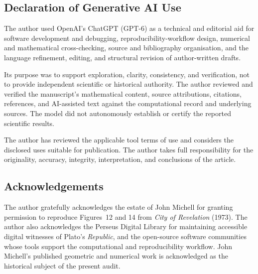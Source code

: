 \documentclass[11pt]{article}
\begin{document}
\subsection*{Declaration of Generative AI Use}

The author used OpenAI's ChatGPT (GPT-6) as a technical and editorial aid
for software development and debugging, reproducibility-workflow design,
numerical and mathematical cross-checking, source and bibliography
organisation, and the language refinement, editing, and structural revision
of author-written drafts.

Its purpose was to support exploration, clarity, consistency, and verification,
not to provide independent scientific or historical authority.  The author
reviewed and verified the manuscript's mathematical content, source
attributions, citations, references, and AI-assisted text against the
computational record and underlying sources.  The model did not autonomously
establish or certify the reported scientific results.

The author has reviewed the applicable tool terms of use and considers the
disclosed uses suitable for publication.  The author takes full responsibility
for the originality, accuracy, integrity, interpretation, and conclusions
of the article.

\subsection*{Acknowledgements}

The author gratefully acknowledges the estate of John Michell for granting
permission to reproduce Figures~12 and 14 from \emph{City of Revelation}
(1973).  The author also acknowledges the Perseus Digital Library for
maintaining accessible digital witnesses of Plato's \emph{Republic}, and the
open-source software communities whose tools support the computational and
reproducibility workflow.  John Michell's published geometric and numerical
work is acknowledged as the historical subject of the present audit.


\begingroup
\raggedright{}

\endgroup
\end{document}
